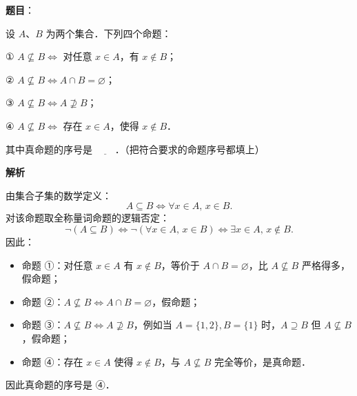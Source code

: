\begin{answer}

\textbf{题目}：

设 $A$、$B$ 为两个集合．下列四个命题：

① $A \not\subseteq B \iff$ 对任意 $x \in A$，有 $x \notin B$；

② $A \not\subseteq B \iff A \cap B = \varnothing$；

③ $A \not\subseteq B \iff A \not\supseteq B$；

④ $A \not\subseteq B \iff$ 存在 $x \in A$，使得 $x \notin B$．

其中真命题的序号是 $\underline{\quad\quad}$．（把符合要求的命题序号都填上）

\textbf{解析}

由集合子集的数学定义：
\nopagebreak[4]
\[
A \subseteq B \iff \forall x \in A, \, x \in B.
\]
对该命题取全称量词命题的逻辑否定：
\nopagebreak[4]
\[
\neg(A \subseteq B) \iff \neg(\forall x \in A, \, x \in B) \iff \exists x \in A, \, x \notin B.
\]
因此：
\begin{itemize}
\item 命题 ①：对任意 $x \in A$ 有 $x \notin B$，等价于 $A \cap B = \varnothing$，比 $A \not\subseteq B$ 严格得多，假命题；
\item 命题 ②：$A \not\subseteq B \iff A \cap B = \varnothing$，假命题；
\item 命题 ③：$A \not\subseteq B \iff A \not\supseteq B$，例如当 $A = \{1, 2\}, B = \{1\}$ 时，$A \supseteq B$ 但 $A \not\subseteq B$，假命题；
\item 命题 ④：存在 $x \in A$ 使得 $x \notin B$，与 $A \not\subseteq B$ 完全等价，是真命题．
\end{itemize}

因此真命题的序号是 ④．


\end{answer}
